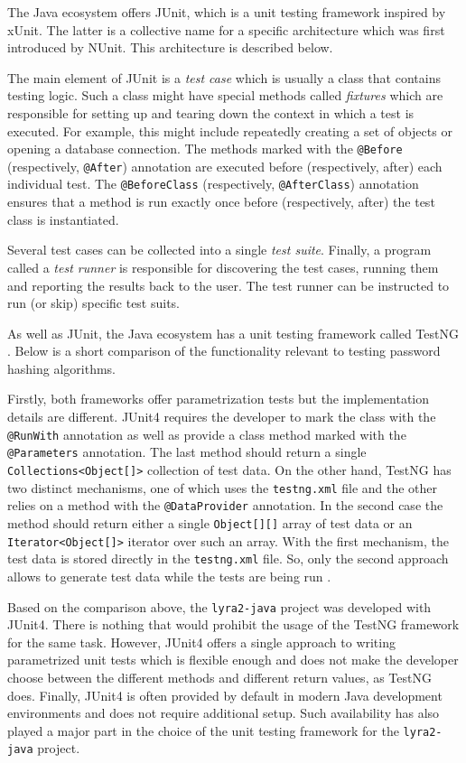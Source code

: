 The Java ecosystem offers JUnit, which is a unit testing framework inspired by xUnit. The latter is a collective name for a specific architecture which was first introduced by NUnit. This architecture is described below.

The main element of JUnit is a \emph{test case} which is usually a class that contains testing logic. Such a class might have special methods called \emph{fixtures} which are responsible for setting up and tearing down the context in which a test is executed. For example, this might include repeatedly creating a set of objects or opening a database connection. The methods marked with the \texttt{@Before} (respectively, \texttt{@After}) annotation are executed before (respectively, after) each individual test. The \texttt{@BeforeClass} (respectively, \texttt{@AfterClass}) annotation ensures that a method is run exactly once before (respectively, after) the test class is instantiated.

Several test cases can be collected into a single \emph{test suite}. Finally, a program called a \emph{test runner} is responsible for discovering the test cases, running them and reporting the results back to the user. The test runner can be instructed to run (or skip) specific test suits.

As well as JUnit, the Java ecosystem has a unit testing framework called TestNG \cite{testng:2017:home}. Below is a short comparison of the functionality relevant to testing password hashing algorithms.

Firstly, both frameworks offer parametrization tests but the implementation details are different. JUnit4 requires the developer to mark the class with the \texttt{@RunWith} annotation as well as provide a class method marked with the \texttt{@Parameters} annotation. The last method should return a single \texttt{Collections<Object[]>} collection of test data. On the other hand, TestNG has two distinct mechanisms, one of which uses the \texttt{testng.xml} file and the other relies on a method with the \texttt{@DataProvider} annotation. In the second case the method should return either a single \texttt{Object[][]} array of test data or an \texttt{Iterator<Object[]>} iterator over such an array. With the first mechanism, the test data is stored directly in the \texttt{testng.xml} file. So, only the second approach allows to generate test data while  the tests are being run \cite{testng:2017:parametrized-testing}.

Based on the comparison above, the \texttt{lyra2-java} project was developed with JUnit4. There is nothing that would prohibit the usage of the TestNG framework for the same task. However, JUnit4 offers a single approach to writing parametrized unit tests which is flexible enough and does not make the developer choose between the different methods and different return values, as TestNG does. Finally, JUnit4 is often provided by default in modern Java development environments and does not require additional setup. Such availability has also played a major part in the choice of the unit testing framework for the \texttt{lyra2-java} project.

